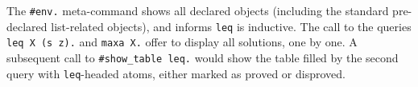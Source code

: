 \documentclass[a4paper,twocolumn]{article}
\begin{document}
The \lstinline+#env.+ meta-command shows all declared objects
(including the standard pre-declared list-related objects), and
informs \lstinline+leq+ is inductive.  The call to the queries
\lstinline+leq X (s z).+ and \lstinline+maxa X.+ offer to display all
solutions, one by one.
A subsequent call to \lstinline+#show_table leq.+ would show the table
filled by the second query with \lstinline+leq+-headed atoms, either
marked as proved or disproved.
\end{document}
